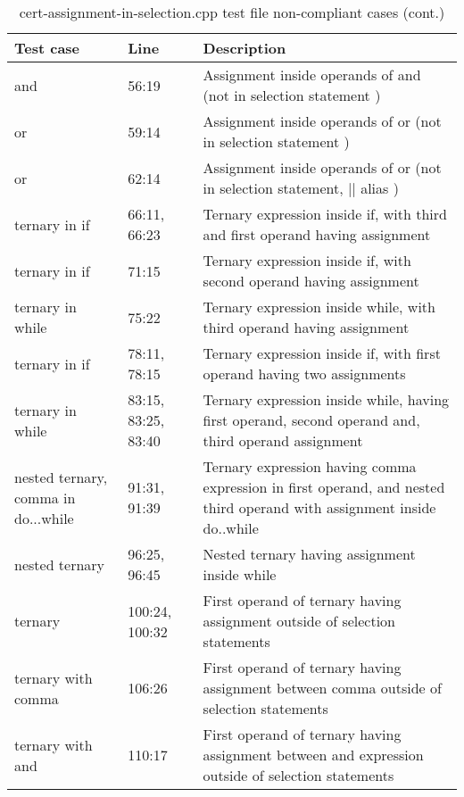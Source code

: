 \begin{table}[H]
    \centering
    \begin{tabular}{|m{}|m{}|m{}|}
        \hline
        \textbf{Test case} & \textbf{Line} & \textbf{Description}  \\
        \hline
        and  & 56:19  & Assignment inside operands of and (not in selection statement
        ) \\
        \hline
        or  & 59:14  & Assignment inside operands of or (not in selection statement
        ) \\
        \hline
        or  & 62:14  & Assignment inside operands of or (not in selection statement, || alias
        ) \\
        \hline
        ternary in if  & 66:11, 66:23  & Ternary expression inside if, with third and first operand having assignment \\
        \hline
        ternary in if  & 71:15  & Ternary expression inside if, with second operand having assignment \\ 
        \hline
        ternary in while  & 75:22  & Ternary expression inside while, with third operand having assignment \\
        \hline
        ternary in if  & 78:11, 78:15  & Ternary expression inside if, with first operand having two assignments \\
        \hline
        ternary in while  & 83:15, 83:25, 83:40  & Ternary expression inside while, having first operand, second operand and, third operand assignment \\
        \hline
        nested ternary, comma in do...while  & 91:31, 91:39  & Ternary expression having comma expression in first operand, and nested third operand with assignment inside do..while \\
        \hline
        nested ternary & 96:25, 96:45  & Nested ternary having assignment inside while \\
        \hline
        ternary & 100:24, 100:32  & First operand of ternary having assignment outside of selection statements \\
        \hline
        ternary with comma & 106:26  & First operand of ternary having assignment between comma outside of selection statements \\
        \hline
        ternary with and & 110:17  & First operand of ternary having assignment between and expression outside of selection statements \\
        \hline
    \end{tabular}
    \caption{\\cert-assignment-in-selection.cpp test file non-compliant cases (cont.)}
    \label{tab:test-lit-2}
\end{table}

